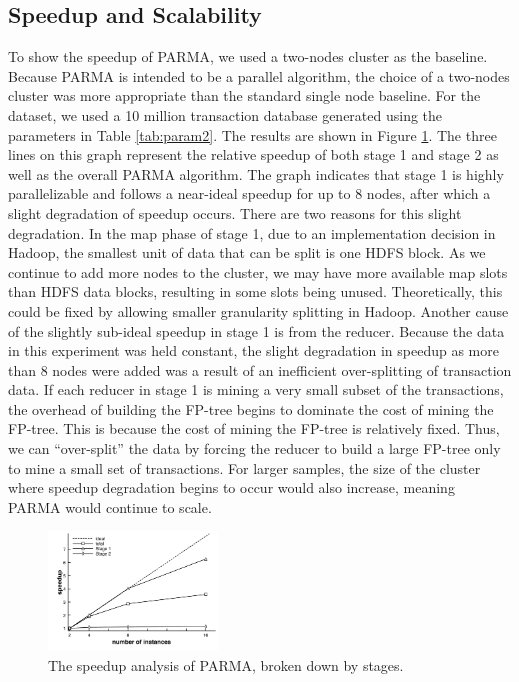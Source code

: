 \subsection{Speedup and Scalability}
To show the speedup of PARMA, we used a two-nodes cluster as the
baseline. Because PARMA is intended to be a parallel algorithm, the choice of a
two-nodes cluster was more appropriate than the standard single node
baseline. For the dataset, we used a 10 million transaction database
generated using the parameters in Table \ref{tab:param2}. The results
are shown in Figure \ref{fig:speedup}. The three lines on this graph
represent the relative speedup of both stage 1 and stage 2 as well as
the overall PARMA algorithm. The graph indicates that stage 1 is highly
parallelizable and follows a near-ideal speedup for up to 8 nodes,
after which a slight degradation of speedup occurs. There are two
reasons for this slight degradation. In the map phase of stage 1, due
to an implementation decision in Hadoop, the smallest unit of data
that can be split is one HDFS block. As we continue to add more nodes
to the cluster, we may have more available map slots than HDFS data
blocks, resulting in some slots being unused. Theoretically, this
could be fixed by allowing smaller granularity splitting in
Hadoop. Another cause of the slightly sub-ideal speedup in stage 1 is
from the reducer. Because the data in this experiment was held
constant, the slight degradation in speedup as more than 8 nodes were
added was a result of an inefficient over-splitting of transaction
data. If each reducer in stage 1 is mining a very small subset of the
transactions, the overhead of building the FP-tree begins to dominate
the cost of mining the FP-tree. This is because the cost of mining the
FP-tree is relatively fixed. Thus, we can ``over-split'' the data by
forcing the reducer to build a large FP-tree only to mine a small set
of transactions. For larger samples, the size of the cluster where
speedup degradation begins to occur would also increase, meaning PARMA
would continue to scale.

\begin{figure}[tb]
 \centering
    \includegraphics[width=0.4\textwidth]{parma/speedup}
  \caption{The speedup analysis of PARMA, broken down by stages.}
\label{fig:speedup}
\end{figure}

